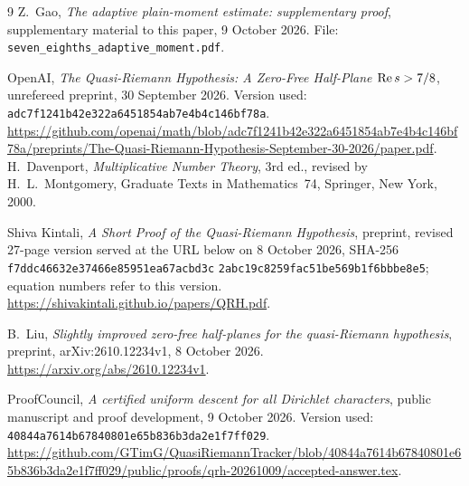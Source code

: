\begin{thebibliography}{9}
Z.~Gao,
\emph{The adaptive plain-moment estimate: supplementary proof},
supplementary material to this paper, 9 October 2026.
File: \nolinkurl{seven_eighths_adaptive_moment.pdf}.
\raggedright
OpenAI,
\emph{The Quasi-Riemann Hypothesis: A Zero-Free Half-Plane
$\operatorname{Re} s>7/8$}, unrefereed preprint, 30 September 2026.
Version used: \texttt{adc7f1241b42e322a6451854ab7e4b4c146bf78a}.
\url{https://github.com/openai/math/blob/adc7f1241b42e322a6451854ab7e4b4c146bf78a/preprints/The-Quasi-Riemann-Hypothesis-September-30-2026/paper.pdf}.
H.~Davenport,
\emph{Multiplicative Number Theory}, 3rd ed., revised by
H.~L.~Montgomery, Graduate Texts in Mathematics~74, Springer,
New York, 2000.
\raggedright
Shiva Kintali,
\emph{A Short Proof of the Quasi-Riemann Hypothesis},
preprint, revised 27-page version served at the URL below on
8 October 2026, SHA-256
\texttt{f7ddc46632e37466e85951ea67acbd3c}\allowbreak
\texttt{2abc19c8259fac51be569b1f6bbbe8e5};
equation numbers refer to this version.
\url{https://shivakintali.github.io/papers/QRH.pdf}.
\raggedright
B.~Liu,
\emph{Slightly improved zero-free half-planes for the quasi-Riemann
hypothesis}, preprint, arXiv:2610.12234v1, 8 October 2026.
\url{https://arxiv.org/abs/2610.12234v1}.
\raggedright
ProofCouncil,
\emph{A certified uniform descent for all Dirichlet characters},
public manuscript and proof development, 9 October 2026.
Version used: \texttt{40844a7614b67840801e65b836b3da2e1f7ff029}.
\url{https://github.com/GTimG/QuasiRiemannTracker/blob/40844a7614b67840801e65b836b3da2e1f7ff029/public/proofs/qrh-20261009/accepted-answer.tex}.
\end{thebibliography}

